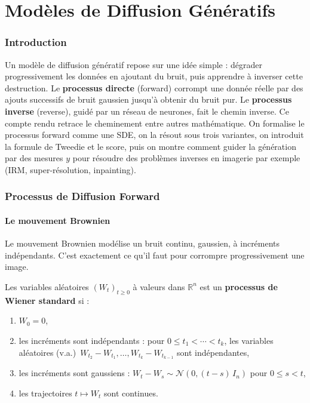 \documentclass[12pt]{article}
\begin{document}
\setcounter{page}{2}\newpage\vspace*{0.5cm}\tableofcontents\newpage

\part{Modèles de Diffusion Génératifs}

\section{Introduction}

Un modèle de diffusion génératif repose sur une idée simple : dégrader progressivement les données en ajoutant du bruit, puis apprendre à inverser cette destruction. Le \textbf{processus directe} (forward) corrompt une donnée réelle par des ajouts successifs de bruit gaussien jusqu'à obtenir du bruit pur. Le \textbf{processus inverse} (reverse), guidé par un réseau de neurones, fait le chemin inverse.
Ce compte rendu retrace le cheminement entre autres mathématique. On formalise le processus forward comme une SDE, on la résout sous trois variantes, on introduit la formule de Tweedie et le score, puis on montre comment guider la génération par des mesures $y$ pour résoudre des problèmes inverses en imagerie par exemple (IRM, super-résolution, inpainting).
\section{Processus de Diffusion Forward}

\subsection{Le mouvement Brownien}

Le mouvement Brownien modélise un bruit continu, gaussien, à incréments indépendants. C'est exactement ce qu'il faut pour corrompre progressivement une image.

\begin{definitionbox}
\label{def:wiener}
Les variables aléatoires $(W_t)_{t \geq 0}$ à valeurs dans $\mathbb{R}^n$ est un \textbf{processus de Wiener standard} si :
\begin{enumerate}[label=(\roman*)]
    \item $W_0 = 0$,
    \item les incréments sont indépendants : pour $0 \leq t_1 < \cdots < t_k$, les variables aléatoires (v.a.)\ $W_{t_2} - W_{t_1}, \ldots, W_{t_k} - W_{t_{k-1}}$ sont indépendantes,
    \item les incréments sont gaussiens : $W_t - W_s \sim \mathcal{N}(0, (t-s)\, I_n)$ pour $0 \leq s < t$,
    \item les trajectoires $t \mapsto W_t$ sont continues.
\end{enumerate}
\end{definitionbox}
\end{document}
